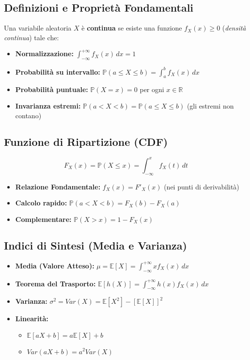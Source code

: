 \documentclass[12pt]{extarticle} %
\begin{document}
\subsection{Definizioni e Proprietà Fondamentali}
Una variabile aleatoria $X$ è \textbf{continua} se esiste una funzione $f_X(x) \ge 0$ (\textit{densità continua}) tale che:
\begin{itemize}
    \item \textbf{Normalizzazione:} $\int_{-\infty}^{+\infty} f_X(x) \, dx = 1$
    \item \textbf{Probabilità su intervallo:} $\mathbb{P}(a \le X \le b) = \int_{a}^{b} f_X(x) \, dx$
    \item \textbf{Probabilità puntuale:} $\mathbb{P}(X = x) = 0$ per ogni $x \in \mathbb{R}$
    \item \textbf{Invarianza estremi:} $\mathbb{P}(a < X < b) = \mathbb{P}(a \le X \le b)$ (gli estremi non contano)
\end{itemize}

\subsection{Funzione di Ripartizione (CDF)}
$$\boxed{F_X(x) = \mathbb{P}(X \le x) = \int_{-\infty}^{x} f_X(t) \, dt}$$
\begin{itemize}
    \item \textbf{Relazione Fondamentale:} $f_X(x) = F'_X(x)$ (nei punti di derivabilità)
    \item \textbf{Calcolo rapido:} $\mathbb{P}(a < X < b) = F_X(b) - F_X(a)$
    \item \textbf{Complementare:} $\mathbb{P}(X > x) = 1 - F_X(x)$
\end{itemize}

\subsection{Indici di Sintesi (Media e Varianza)}
\begin{itemize}
    \item \textbf{Media (Valore Atteso):} $\mu = \mathbb{E}[X] = \int_{-\infty}^{+\infty} x f_X(x) \, dx$
    \item \textbf{Teorema del Trasporto:} $\mathbb{E}[h(X)] = \int_{-\infty}^{+\infty} h(x) f_X(x) \, dx$
    \item \textbf{Varianza:} $\sigma^2 = Var(X) = \mathbb{E}[X^2] - [\mathbb{E}[X]]^2$
    \item \textbf{Linearità:} 
    \begin{itemize}
        \item $\mathbb{E}[aX + b] = a\mathbb{E}[X] + b$
        \item $Var(aX + b) = a^2 Var(X)$
    \end{itemize}
\end{itemize}
\end{document}

